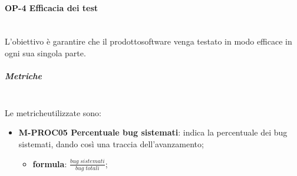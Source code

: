 	\paragraph{OP-4 Efficacia dei test}\mbox{} \\ [1mm]
	L'obiettivo è garantire che il prodotto\glosp software venga testato in modo efficace in ogni sua singola parte.
	\subparagraph{Metriche}\mbox{}\\ [1mm]
	Le metriche\glosp utilizzate sono:
	\begin{itemize}
		\item \textbf{M-PROC05 Percentuale bug sistemati}: indica la percentuale dei bug sistemati, dando così una traccia dell'avanzamento;
		\begin{itemize}
			\item[] \textbf{formula}: $\frac{bug \; sistemati}{bug \; totali}$;
		\end{itemize}
	\end{itemize}

